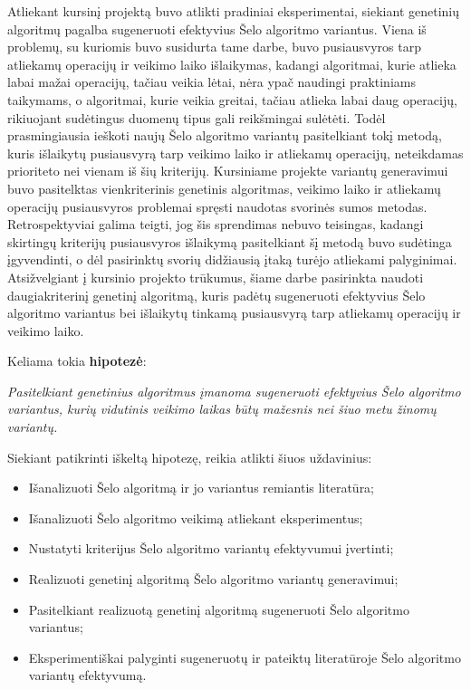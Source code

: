 \documentclass{VUMIFInfBakalaurinis}
\begin{document}
Atliekant kursinį projektą buvo atlikti pradiniai eksperimentai, siekiant genetinių algoritmų pagalba sugeneruoti efektyvius Šelo algoritmo variantus.
Viena iš problemų, su kuriomis buvo susidurta tame darbe, buvo pusiausvyros tarp atliekamų operacijų ir veikimo laiko išlaikymas, kadangi
algoritmai, kurie atlieka labai mažai operacijų, tačiau veikia lėtai, nėra ypač naudingi praktiniams taikymams, o  
algoritmai, kurie veikia greitai, tačiau atlieka labai daug operacijų, rikiuojant sudėtingus duomenų tipus gali reikšmingai sulėtėti.
Todėl prasmingiausia ieškoti naujų Šelo algoritmo variantų pasitelkiant tokį metodą, kuris išlaikytų pusiausvyrą tarp veikimo laiko ir atliekamų operacijų,
neteikdamas prioriteto nei vienam iš šių kriterijų.
Kursiniame projekte variantų generavimui buvo pasitelktas vienkriterinis genetinis algoritmas, veikimo laiko ir atliekamų operacijų pusiausvyros problemai spręsti
naudotas svorinės sumos metodas.
Retrospektyviai galima teigti, jog šis sprendimas nebuvo teisingas, kadangi skirtingų kriterijų pusiausvyros išlaikymą
pasitelkiant šį metodą buvo sudėtinga įgyvendinti, o dėl pasirinktų svorių didžiausią įtaką turėjo atliekami palyginimai.
Atsižvelgiant į kursinio projekto trūkumus, šiame darbe pasirinkta naudoti daugiakriterinį genetinį algoritmą, kuris
padėtų sugeneruoti efektyvius Šelo algoritmo variantus bei išlaikytų tinkamą pusiausvyrą tarp atliekamų operacijų ir veikimo laiko.

\pagebreak

Keliama tokia \textbf{hipotezė}:

\textit{Pasitelkiant genetinius algoritmus įmanoma sugeneruoti efektyvius Šelo algoritmo variantus,
kurių vidutinis veikimo laikas būtų mažesnis nei šiuo metu žinomų variantų.}

\medskip

Siekiant patikrinti iškeltą hipotezę, reikia atlikti šiuos uždavinius:
\begin{itemize}
    \item Išanalizuoti Šelo algoritmą ir jo variantus remiantis literatūra;
    \item Išanalizuoti Šelo algoritmo veikimą atliekant eksperimentus;
    \item Nustatyti kriterijus Šelo algoritmo variantų efektyvumui įvertinti;
    \item Realizuoti genetinį algoritmą Šelo algoritmo variantų generavimui;
    \item Pasitelkiant realizuotą genetinį algoritmą sugeneruoti Šelo algoritmo variantus;
    \item Eksperimentiškai palyginti sugeneruotų ir pateiktų literatūroje Šelo algoritmo variantų efektyvumą.
  \end{itemize}
\end{document}

